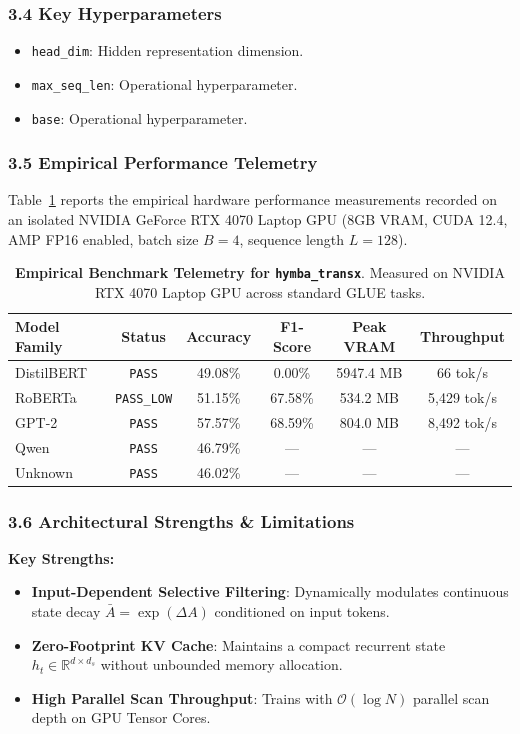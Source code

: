 \subsubsection*{3.4 Key Hyperparameters}
\begin{itemize}
    \item \texttt{head\_dim}: Hidden representation dimension.
    \item \texttt{max\_seq\_len}: Operational hyperparameter.
    \item \texttt{base}: Operational hyperparameter.
\end{itemize}

\subsubsection*{3.5 Empirical Performance Telemetry}
Table~\ref{tab:telemetry_hymba_transx} reports the empirical hardware performance measurements recorded on an isolated NVIDIA GeForce RTX 4070 Laptop GPU (8GB VRAM, CUDA 12.4, AMP FP16 enabled, batch size $B=4$, sequence length $L=128$).

\begin{table}[h]
\centering
\small
\caption{\textbf{Empirical Benchmark Telemetry for \texttt{hymba\_transx}}. Measured on NVIDIA RTX 4070 Laptop GPU across standard GLUE tasks.}
\label{tab:telemetry_hymba_transx}
\begin{tabular*}{\columnwidth}{@{\extracolsep{\fill}}lccccc}
\toprule
\textbf{Model Family} & \textbf{Status} & \textbf{Accuracy} & \textbf{F1-Score} & \textbf{Peak VRAM} & \textbf{Throughput} \\
\midrule
DistilBERT & \texttt{PASS} & 49.08\% & 0.00\% & 5947.4 MB & 66 tok/s \\
RoBERTa & \texttt{PASS\_LOW} & 51.15\% & 67.58\% & 534.2 MB & 5,429 tok/s \\
GPT-2 & \texttt{PASS} & 57.57\% & 68.59\% & 804.0 MB & 8,492 tok/s \\
Qwen & \texttt{PASS} & 46.79\% & --- & --- & --- \\
Unknown & \texttt{PASS} & 46.02\% & --- & --- & --- \\
\bottomrule
\end{tabular*}
\end{table}

\subsubsection*{3.6 Architectural Strengths \& Limitations}
\textbf{Key Strengths:}
\begin{itemize}
    \item \textbf{Input-Dependent Selective Filtering}: Dynamically modulates continuous state decay $\bar{A} = \exp(\Delta A)$ conditioned on input tokens.
    \item \textbf{Zero-Footprint KV Cache}: Maintains a compact recurrent state $h_t \in \mathbb{R}^{d \times d_s}$ without unbounded memory allocation.
    \item \textbf{High Parallel Scan Throughput}: Trains with $\mathcal{O}(\log N)$ parallel scan depth on GPU Tensor Cores.
\end{itemize}

